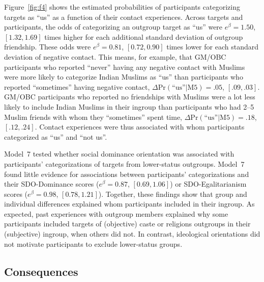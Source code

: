 \documentclass[12pt, a4paper]{article}
\newcommand{\pdif}[4]{$ \Delta\text{Pr} (\text{``us''} | \text{#1}) = #2$, $[#3, #4]$}
\begin{document}
Figure~\ref{fig:f4} shows the estimated probabilities of participants categorizing targets as ``us'' as a function of their contact experiences. Across targets and participants, the odds of categorizing an outgroup target as ``us'' were $e^\beta = 1.50$, $[1.32, 1.69]$ times higher for each additional standard deviation of outgroup friendship. These odds were $e^\beta = 0.81$, $[0.72, 0.90]$ times lower for each standard deviation of negative contact. This means, for example, that GM/OBC participants who reported ``never'' having any negative contact with Muslims were more likely to categorize Indian Muslims as ``us'' than participants who reported ``sometimes'' having negative contact, \pdif{M5}{.05}{.09}{.03}. GM/OBC participants who reported no friendships with Muslims were a lot less likely to include Indian Muslims in their ingroup than participants who had 2--5 Muslim friends with whom they ``sometimes'' spent time, \pdif{M5}{.18}{.12}{.24}. Contact experiences were thus associated with whom participants categorized as ``us'' and ``not us''.

Model~7 tested whether social dominance orientation was associated with participants’ categorizations of targets from lower-status outgroups. Model~7 found little evidence for associations between participants’ categorizations and their SDO-Dominance scores ($e^\beta = 0.87$, $[0.69, 1.06]$) or SDO-Egalitarianism scores ($e^\beta = 0.98$, $[0.78, 1.21]$). Together, these findings show that group and individual differences explained whom participants included in their ingroup. As expected, past experiences with outgroup members explained why some participants included targets of (objective) caste or religions outgroups in their (subjective) ingroup, when others did not. In contrast, ideological orientations did not motivate participants to exclude lower-status groups.

\subsection{Consequences}
\end{document}
